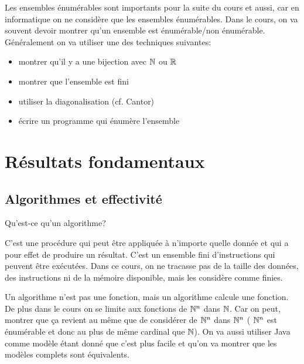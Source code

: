 Les ensembles énumérables sont importants pour la suite du cours et aussi, car en 
informatique on ne considère que les ensembles énumérables.
Dans le cours, on va souvent devoir montrer qu'un ensemble est énumérable/non énumérable.
Généralement on va utiliser une des techniques suivantes: 
\begin{itemize}
	\item montrer qu'il y a une bijection avec $\mathbb{N}$ ou $\mathbb{R}$
	\item montrer que l'ensemble est fini
	\item utiliser la diagonalisation (cf. Cantor)
	\item écrire un programme qui énumère l'ensemble
\end{itemize}


\section{Résultats fondamentaux}
\label{sec:r_sultats_fondamentaux}

\subsection{Algorithmes et effectivité}
\label{sub:algorithmes_et_effectivit_}
Qu'est-ce qu'un algorithme? 

\begin{mydef}[Algorithme]
	C'est une procédure qui peut être appliquée à n'importe
	quelle donnée et qui a pour effet de produire un résultat. C'est un ensemble fini
	d'instructions qui peuvent être exécutées. Dans ce cours, on ne tracasse pas 
	de la taille des données, des instructions ni de la mémoire disponible, mais 
	les considère comme finies. 
\end{mydef}

\begin{myrem}
	Un algorithme n'est pas une fonction, mais un algorithme calcule une 
	fonction.
	De plus dans le cours on se limite aux fonctions de $\mathbb{N}^n$ dans $\mathbb{N}$. Car on peut,
	montrer que ça revient au même que de considérer de $\mathbb{N}^n$ dans $\mathbb{N}^n$ (
	$\mathbb{N}^n$ est énumérable et donc au plus de même cardinal que $\mathbb{N}$). On va aussi
	utiliser Java comme modèle étant donné que c'est plus facile et qu'on va montrer 
	que les modèles complets sont équivalents.
\end{myrem}


